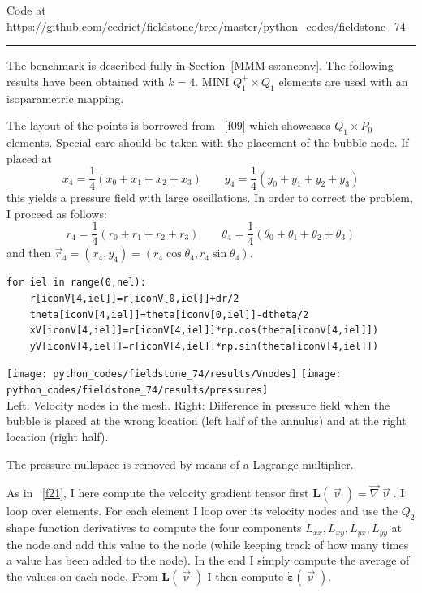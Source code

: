 


\begin{center}
Code at \url{https://github.com/cedrict/fieldstone/tree/master/python_codes/fieldstone_74}
\end{center}

\par\noindent\rule{\textwidth}{0.4pt}


The benchmark is described fully in Section~\ref{MMM-ss:anconv}. 
The following results have been obtained with $k=4$.
MINI $Q_1^+ \times Q_1$ elements are used with an isoparametric mapping. 

The layout of the points is borrowed from \stone~\ref{f09} which 
showcases $Q_1 \times P_0$ elements. 
Special care should be taken with the placement of the bubble node.  
If placed at 
\[
x_4 = \frac{1}{4}(x_0+x_1+x_2+x_3)
\qquad
y_4 = \frac{1}{4}(y_0+y_1+y_2+y_3)
\]
this yields a pressure field with large oscillations. In order to correct the 
problem, I proceed as follows:
\[
r_4 = \frac{1}{4}(r_0+r_1+r_2+r_3)
\qquad
\theta_4 = \frac{1}{4}(\theta_0+\theta_1+\theta_2+\theta_3)
\]
and then $\vec{r}_4=(x_4,y_4)=(r_4 \cos\theta_4,r_4 \sin\theta_4)$.

\begin{lstlisting}
for iel in range(0,nel):
    r[iconV[4,iel]]=r[iconV[0,iel]]+dr/2
    theta[iconV[4,iel]]=theta[iconV[0,iel]]-dtheta/2
    xV[iconV[4,iel]]=r[iconV[4,iel]]*np.cos(theta[iconV[4,iel]])
    yV[iconV[4,iel]]=r[iconV[4,iel]]*np.sin(theta[iconV[4,iel]])
\end{lstlisting}

\begin{center}
\texttt{[image: python\_codes/fieldstone\_74/results/Vnodes]}
\texttt{[image: python\_codes/fieldstone\_74/results/pressures]}\\
{\captionfont Left: Velocity nodes in the mesh. Right: 
Difference in pressure field when the bubble is placed
at the wrong location (left half of the annulus) and at the right location (right half).}
\end{center}

The pressure nullspace is removed by means of a Lagrange multiplier.

As in \stone~\ref{f21}, I here compute the velocity gradient tensor 
first ${\bm L}(\vec\upnu)=\vec\nabla\vec\upnu$.
I loop over elements. For each element I loop over its velocity nodes and use the $Q_2$ 
shape function derivatives to compute the four components $L_{xx},L_{xy},L_{yx},L_{yy}$ at 
the node and add this value to the node (while keeping track of how many times a value
has been added to the node). In the end I simply compute the average of the values
on each node. From ${\bm L}(\vec\upnu)$ I then compute $\dot{\bm \varepsilon}(\vec\upnu)$. 

